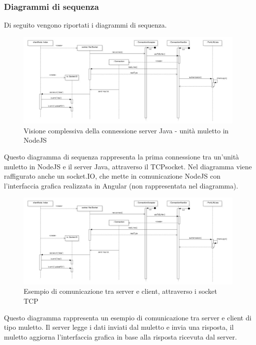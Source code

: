
\subsubsection{Diagrammi di sequenza}
Di seguito vengono riportati i diagrammi di sequenza.
\begin{figure}[H]
	\centering
	\includegraphics[scale=0.55]{res/diagrams/sequenza/connect unit.jpg}
	\caption{Visione complessiva della connessione server Java - unità muletto in NodeJS}
\end{figure}
Questo diagramma di sequenza rappresenta la prima connessione tra un'unità muletto in NodeJS e il server Java, attraverso il TCPsocket.
Nel diagramma viene raffigurato anche un socket.IO, che mette in comunicazione NodeJS con l'interfaccia grafica realizzata in Angular (non rappresentata nel diagramma).
\begin{figure}[H]
	\centering
	\includegraphics[scale=0.55]{res/diagrams/sequenza/connect unit.jpg}
	\caption{Esempio di comunicazione tra server e client, attraverso i socket TCP}
\end{figure}
Questo diagramma rappresenta un esempio di comunicazione tra server e client di tipo muletto. Il server legge i dati inviati dal muletto e invia una risposta, il muletto aggiorna l'interfaccia grafica in base alla risposta ricevuta dal server.